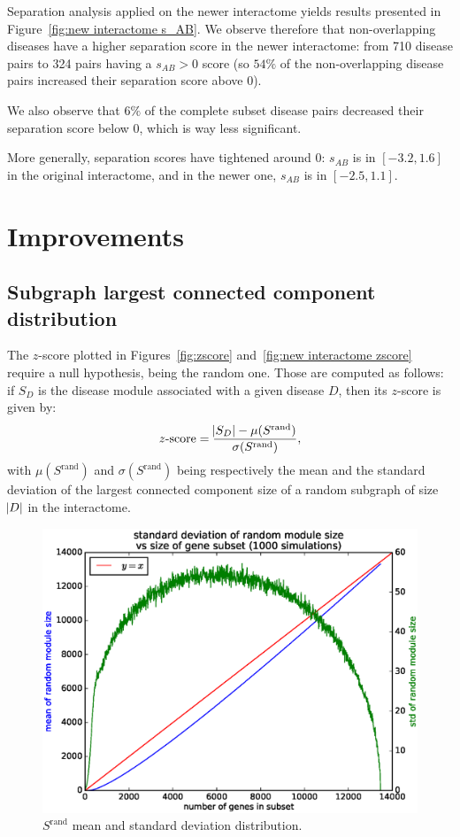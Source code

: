 \documentclass[letterpaper]{article}
\begin{document}
	Separation analysis applied on the newer interactome yields results presented in Figure~\ref{fig:new interactome s_AB}.
	We observe therefore that non-overlapping diseases have a higher separation score in the newer interactome: from 710
	disease pairs to 324 pairs having a $s_{AB} > 0$ score (so $54\%$ of the non-overlapping disease pairs increased their
	separation score above 0).

	We also observe that $6\%$ of the complete subset disease pairs decreased their separation score below 0, which is way
	less significant.

	More generally, separation scores have tightened around 0: $s_{AB}$ is in $[-3.2, 1.6]$ in the original interactome, and
	in the newer one, $s_{AB}$ is in $[-2.5, 1.1]$.

\section{Improvements}

	\subsection{Subgraph largest connected component distribution}
	The $z$-score plotted in Figures~\ref{fig:zscore} and~\ref{fig:new interactome zscore} require a null hypothesis, being the random one.
	Those are computed as follows: if $S_D$ is the disease module associated with a given disease $D$,
	then its $z$-score is given by:
	\begin{equation}
		z\text{-score} = \frac {\abs {S_D} - \mu(S^{\text{rand}})}{\sigma(S^{\text{rand}})},
	\end{equation}
	with $\mu(S^{\text{rand}})$ and $\sigma(S^{\text{rand}})$ being respectively the mean and the
	standard deviation of the largest connected component size of a random subgraph of size $\abs D$
	in the interactome.

	\begin{figure}[!h]\centering
		\includegraphics[width=.45\textwidth]{images/Srand_distribution_1000_sims.eps}
		\caption{$S^{\text{rand}}$ mean and standard deviation distribution.\label{fig:Srand distribution}}
	\end{figure}
\end{document}
